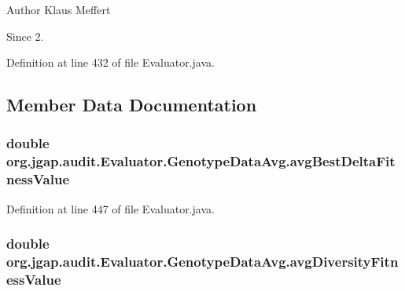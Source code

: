 \begin{DoxyAuthor}{Author}
Klaus Meffert 
\end{DoxyAuthor}
\begin{DoxySince}{Since}
2. 
\end{DoxySince}


Definition at line 432 of file Evaluator.\-java.



\subsection{Member Data Documentation}
\hypertarget{classorg_1_1jgap_1_1audit_1_1_evaluator_1_1_genotype_data_avg_a8de77e171d9d124e7598129b75a47cf7}{
\subsubsection[{avg\-Best\-Delta\-Fitness\-Value}]{\setlength{\rightskip}{0pt plus 5cm}double org.\-jgap.\-audit.\-Evaluator.\-Genotype\-Data\-Avg.\-avg\-Best\-Delta\-Fitness\-Value}}\label{classorg_1_1jgap_1_1audit_1_1_evaluator_1_1_genotype_data_avg_a8de77e171d9d124e7598129b75a47cf7}


Definition at line 447 of file Evaluator.\-java.

\hypertarget{classorg_1_1jgap_1_1audit_1_1_evaluator_1_1_genotype_data_avg_abddaf3378c5c0823b44bdcf3d48cfe5e}{
\subsubsection[{avg\-Diversity\-Fitness\-Value}]{\setlength{\rightskip}{0pt plus 5cm}double org.\-jgap.\-audit.\-Evaluator.\-Genotype\-Data\-Avg.\-avg\-Diversity\-Fitness\-Value}}\label{classorg_1_1jgap_1_1audit_1_1_evaluator_1_1_genotype_data_avg_abddaf3378c5c0823b44bdcf3d48cfe5e}


